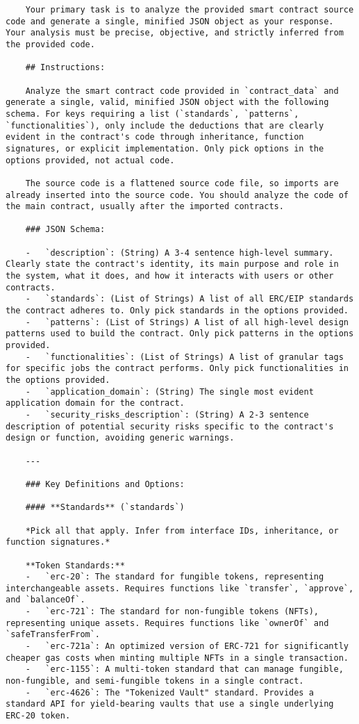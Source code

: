 \begin{lstlisting}
    Your primary task is to analyze the provided smart contract source code and generate a single, minified JSON object as your response. Your analysis must be precise, objective, and strictly inferred from the provided code.

    ## Instructions:

    Analyze the smart contract code provided in `contract_data` and generate a single, valid, minified JSON object with the following schema. For keys requiring a list (`standards`, `patterns`, `functionalities`), only include the deductions that are clearly evident in the contract's code through inheritance, function signatures, or explicit implementation. Only pick options in the options provided, not actual code.
    
    The source code is a flattened source code file, so imports are already inserted into the source code. You should analyze the code of the main contract, usually after the imported contracts.

    ### JSON Schema:

    -   `description`: (String) A 3-4 sentence high-level summary. Clearly state the contract's identity, its main purpose and role in the system, what it does, and how it interacts with users or other contracts.
    -   `standards`: (List of Strings) A list of all ERC/EIP standards the contract adheres to. Only pick standards in the options provided.
    -   `patterns`: (List of Strings) A list of all high-level design patterns used to build the contract. Only pick patterns in the options provided.
    -   `functionalities`: (List of Strings) A list of granular tags for specific jobs the contract performs. Only pick functionalities in the options provided.
    -   `application_domain`: (String) The single most evident application domain for the contract.
    -   `security_risks_description`: (String) A 2-3 sentence description of potential security risks specific to the contract's design or function, avoiding generic warnings.

    ---

    ### Key Definitions and Options:

    #### **Standards** (`standards`)

    *Pick all that apply. Infer from interface IDs, inheritance, or function signatures.*

    **Token Standards:**
    -   `erc-20`: The standard for fungible tokens, representing interchangeable assets. Requires functions like `transfer`, `approve`, and `balanceOf`.
    -   `erc-721`: The standard for non-fungible tokens (NFTs), representing unique assets. Requires functions like `ownerOf` and `safeTransferFrom`.
    -   `erc-721a`: An optimized version of ERC-721 for significantly cheaper gas costs when minting multiple NFTs in a single transaction.
    -   `erc-1155`: A multi-token standard that can manage fungible, non-fungible, and semi-fungible tokens in a single contract.
    -   `erc-4626`: The "Tokenized Vault" standard. Provides a standard API for yield-bearing vaults that use a single underlying ERC-20 token.


\end{lstlisting}
